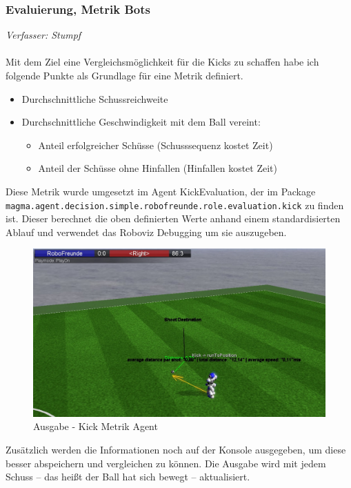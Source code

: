 \documentclass[fontsize=12pt,a4paper,final]{scrartcl}[2003/01/01]
\makeatletter
\def\ScaleIfNeeded{%
	\ifdim\Gin@nat@width>\linewidth
		\linewidth
	\else
		\Gin@nat@width
	\fi
}
\makeatother
\begin{document}
\subsubsection{Evaluierung, Metrik Bots}
\textit{Verfasser: Stumpf}\\
\\
Mit dem Ziel eine Vergleichsmöglichkeit für die Kicks zu schaffen habe ich folgende Punkte als Grundlage für eine Metrik definiert.

\begin{itemize}
\item Durchschnittliche Schussreichweite
\item Durchschnittliche Geschwindigkeit mit dem Ball vereint:
	\begin{itemize}
	\item Anteil erfolgreicher Schüsse (Schusssequenz kostet Zeit)
	\item Anteil der Schüsse ohne Hinfallen (Hinfallen kostet Zeit)
	\end{itemize}
\end{itemize}

Diese Metrik wurde umgesetzt im Agent KickEvaluation, der im Package\\ \texttt{magma.agent.decision.simple.robofreunde.role.evaluation.kick} zu finden ist. Dieser berechnet die oben definierten Werte anhand einem standardisierten Ablauf und verwendet das Roboviz Debugging um sie auszugeben.		

\begin{figure}[H]
	\centering
	\includegraphics[width=\ScaleIfNeeded]{Grafiken/Kick/KickMetrikAgent}
	\caption{Ausgabe - Kick Metrik Agent}
	\label{KickMetrikAgent}
\end{figure}

Zusätzlich werden die Informationen noch auf der Konsole ausgegeben, um diese besser abspeichern und vergleichen zu können. Die Ausgabe wird mit jedem Schuss -- das hei{\ss}t der Ball hat sich bewegt -- aktualisiert.
\end{document}
